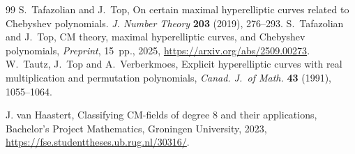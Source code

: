 \documentclass[a4paper,12pt]{amsart}
\numberwithin{equation}{section}
\theoremstyle{plain}
\numberwithin{thm}{section}
\begin{document}
\begin{thebibliography}{99}
    S.~Tafazolian and J.~Top, On certain maximal hyperelliptic curves related to Chebyshev polynomials. \textit{J. Number Theory} \textbf{203} (2019), 276--293. 
 S.~Tafazolian and J.~Top, CM theory, maximal hyperelliptic curves, and Chebyshev polynomials,
\textit{Preprint}, 15~pp., 2025, \url{https://arxiv.org/abs/2509.00273}.
 W.~Tautz, J.~Top and A.~Verberkmoes,
Explicit hyperelliptic curves with real multiplication
 and permutation polynomials,
 \textit{Canad. J.\ of Math.} \textbf{43} (1991),
 1055--1064.

  J.  van Haastert, Classifying CM-fields of degree
8 and their applications, Bachelor's Project Mathematics, Groningen University, 2023, \url{https://fse.studenttheses.ub.rug.nl/30316/}.
\end{thebibliography}


 
\end{document}
